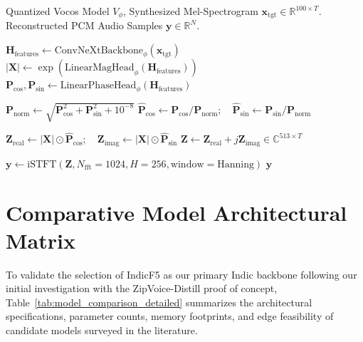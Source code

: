 \begin{algorithm}[htbp]
\caption{Vocos Neural Fourier Audio Synthesis}
\label{alg:vocos_inversion}
\begin{algorithmic}[1]
\Require Quantized Vocos Model $V_\phi$, Synthesized Mel-Spectrogram $\mathbf{x}_{\text{tgt}} \in \mathbb{R}^{100 \times T}$.
\Ensure Reconstructed PCM Audio Samples $\mathbf{y} \in \mathbb{R}^N$.

\State $\mathbf{H}_{\text{features}} \gets \text{ConvNeXtBackbone}_\phi(\mathbf{x}_{\text{tgt}})$
\State $|\mathbf{X}| \gets \exp\left(\text{LinearMagHead}_\phi(\mathbf{H}_{\text{features}})\right)$ 
\State $\mathbf{P}_{\text{cos}}, \mathbf{P}_{\text{sin}} \gets \text{LinearPhaseHead}_\phi(\mathbf{H}_{\text{features}})$

\State $\mathbf{P}_{\text{norm}} \gets \sqrt{\mathbf{P}_{\text{cos}}^2 + \mathbf{P}_{\text{sin}}^2 + 10^{-8}}$
\State $\hat{\mathbf{P}}_{\text{cos}} \gets \mathbf{P}_{\text{cos}} / \mathbf{P}_{\text{norm}}; \quad \hat{\mathbf{P}}_{\text{sin}} \gets \mathbf{P}_{\text{sin}} / \mathbf{P}_{\text{norm}}$

\State $\mathbf{Z}_{\text{real}} \gets |\mathbf{X}| \odot \hat{\mathbf{P}}_{\text{cos}}; \quad \mathbf{Z}_{\text{imag}} \gets |\mathbf{X}| \odot \hat{\mathbf{P}}_{\text{sin}}$
\State $\mathbf{Z} \gets \mathbf{Z}_{\text{real}} + j \mathbf{Z}_{\text{imag}} \in \mathbb{C}^{513 \times T}$

\State $\mathbf{y} \gets \text{iSTFT}(\mathbf{Z}, N_{\text{fft}}=1024, H=256, \text{window}=\text{Hanning})$
\State \Return $\mathbf{y}$
\end{algorithmic}
\end{algorithm}

\section{Comparative Model Architectural Matrix}
To validate the selection of IndicF5 as our primary Indic backbone following our initial investigation with the ZipVoice-Distill proof of concept, Table~\ref{tab:model_comparison_detailed} summarizes the architectural specifications, parameter counts, memory footprints, and edge feasibility of candidate models surveyed in the literature.

